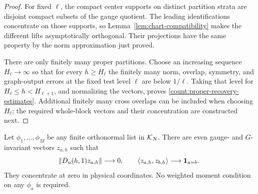 \begin{proof}
For fixed \(\ell\), the compact center supports on distinct partition
strata are disjoint compact subsets of the gauge quotient. The leading
identifications concentrate on those supports, so
Lemma~\ref{lem:chart-compatibility} makes the different lifts
asymptotically orthogonal. Their projections have the same property by
the norm approximation just proved.

There are only finitely many proper partitions. Choose an increasing
sequence \(H_\ell\to\infty\) so that for every \(h\ge H_\ell\) the finitely
many norm, overlap, symmetry, and graph-output errors at the fixed test
level \(\ell\) are below \(1/\ell\). Taking that level for
\(H_\ell\le h<H_{\ell+1}\), and normalizing the vectors, proves
\eqref{count:proper-recovery-estimates}. Additional finitely many cross
overlaps can be included when choosing \(H_\ell\); the required
whole-block vectors and their concentration are constructed next.
\end{proof}

\begin{lemma}
\label{count:whole-recovery}
Let \(\phi_1,\ldots,\phi_M\) be any finite orthonormal list in \(\mathcal K_N\).
There are even gauge- and \(G\)-invariant vectors \(z_{a,h}\) such that
\begin{equation}\label{count:whole-recovery-estimates}
 \left\lVert D_u(h,1)z_{a,h}\right\rVert\longrightarrow0,
 \qquad \left\langle z_{a,h},z_{b,h}\right\rangle\longrightarrow\mathbf1_{a=b}.
\end{equation}
They concentrate at zero in physical coordinates. No weighted moment
condition on any \(\phi_a\) is required.
\end{lemma}

